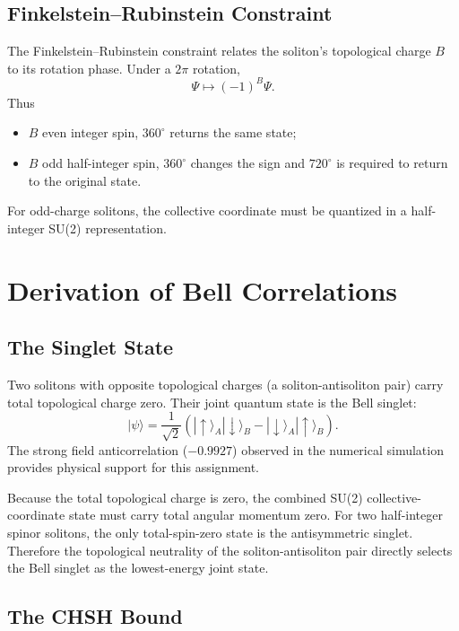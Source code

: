 ﻿\documentclass[11pt,a4paper]{article}
\begin{document}
\subsection{Finkelstein--Rubinstein Constraint}

The Finkelstein--Rubinstein constraint relates the soliton's topological charge $B$ to its rotation phase. Under a $2\pi$ rotation,
\begin{equation}
\Psi \mapsto (-1)^B \Psi.
\end{equation}
Thus
\begin{itemize}
\item $B$ even \Rightarrow integer spin, $360^\circ$ returns the same state;\\
\item $B$ odd \Rightarrow half-integer spin, $360^\circ$ changes the sign and $720^\circ$ is required to return to the original state.
\end{itemize}
For odd-charge solitons, the collective coordinate must be quantized in a half-integer SU(2) representation.
\section{Derivation of Bell Correlations}

\subsection{The Singlet State}

Two solitons with opposite topological charges (a soliton-antisoliton pair) carry total topological charge zero. Their joint quantum state is the Bell singlet:
\begin{equation}
|\psi\rangle = \frac{1}{\sqrt{2}}(|{\uparrow}\rangle_A|{\downarrow}\rangle_B - |{\downarrow}\rangle_A|{\uparrow}\rangle_B).
\end{equation}
The strong field anticorrelation ($-0.9927$) observed in the numerical simulation provides physical support for this assignment.

Because the total topological charge is zero, the combined SU(2) collective-coordinate state must carry total angular momentum zero. For two half-integer spinor solitons, the only total-spin-zero state is the antisymmetric singlet. Therefore the topological neutrality of the soliton-antisoliton pair directly selects the Bell singlet as the lowest-energy joint state.

\subsection{The CHSH Bound}
\end{document}

